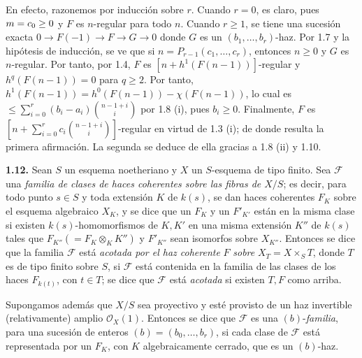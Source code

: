En efecto, razonemos por inducción sobre \(r\). Cuando \(r=0\), es claro,
pues \(\sisi{m=0}{m=c_0\ge0}\) y \(F\) es \(n\)-regular para todo \(n\). Cuando \(r\ge1\), %
se tiene una sucesión exacta
$0\longrightarrow F(-1)\longrightarrow F\longrightarrow G\longrightarrow0$
donde \(G\) es un \((b_1,\ldots,b_r)\)-haz. Por 1.7 y la hipótesis de
inducción, se ve que si \(n=P_{r-1}(c_1,\ldots,c_r)\), entonces \(n\ge0\) y
\(G\) es \(n\)-regular. Por tanto, por 1.4, \(F\) es
\([n+h^1(F(n-1))]\)-regular y \(h^q(F(n-1))=0\) para \(q\ge2\). Por tanto,
\(h^1(F(n-1))=h^0(F(n-1))-\chi(F(n-1))\), lo cual es
\(\le \sum_{i=0}^{r}(b_i-a_i)\binom{n-1+i}{i}\) por 1.8 (i), pues
\(b_i\ge0\). Finalmente, \(F\) es %
\(\left[n+\sum_{i=0}^{r}c_i\binom{n-1+i}{i}\right]\)-regular en virtud de
1.3 (i); de donde resulta la primera afirmación. La segunda se deduce de ella
gracias a 1.8 (ii) y 1.10.

\textbf{1.12.} Sean \(S\) un esquema noetheriano y \(X\) un \(S\)-esquema
de tipo finito. Sea \(\mathcal F\) una \emph{familia de clases de haces
coherentes sobre las fibras de \(X/S\)}; es decir, para todo punto
\(s\in S\) y toda extensión \(K\) de \(k(s)\), se dan haces coherentes
\(F_K\) sobre el esquema algebraico \(X_K\), y se dice que un \(F_K\) y un
\(F'_{K'}\) están en la misma clase si existen \(k(s)\)-homomorfismos de
\(K,K'\) en una misma extensión \(K''\) de \(k(s)\) tales que
\(F_{K''}(=F_K\otimes_K K'')\) y \(F'_{K''}\) sean isomorfos sobre
\(X_{K''}\). Entonces se dice que la familia \(\mathcal F\) está
\emph{acotada por el haz coherente} \(F\) \emph{sobre}
\(X_T=X\times_S T\), donde \(T\) es de tipo finito sobre \(S\), si
\(\mathcal F\) está contenida en la familia de las clases de los haces
\(F_{k(t)}\), con \(t\in T\); se dice que \(\mathcal F\) está
\emph{acotada} si existen \(T,F\) como arriba.

Supongamos además que \(X/S\) sea proyectivo y esté provisto de un haz
invertible (relativamente) amplio \(\mathcal O_X(1)\). Entonces se dice que
\(\mathcal F\) es una \((b)\)-\emph{familia}, para una sucesión de enteros
\((b)=(b_0,\ldots,b_r)\), si cada clase de \(\mathcal F\) está representada
por un \(F_K\), con \(K\) algebraicamente cerrado, que es un \((b)\)-haz.
